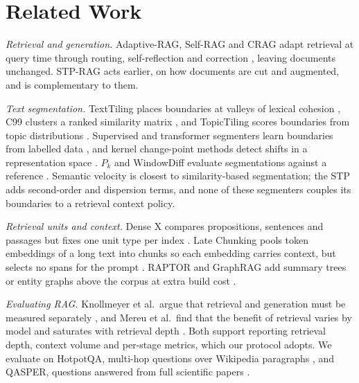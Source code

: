 \documentclass[conference,a4paper]{IEEEtran}
\begin{document}
\section{Related Work}
\label{sec:related}

\textit{Retrieval and generation.} Adaptive-RAG, Self-RAG and CRAG adapt retrieval at query time through routing, self-reflection and correction \cite{jeong2024adaptiverag,asai2024selfrag,yan2024crag}, leaving documents unchanged. STP-RAG acts earlier, on how documents are cut and augmented, and is complementary to them.

\textit{Text segmentation.} TextTiling places boundaries at valleys of lexical cohesion \cite{hearst1997texttiling}, C99 clusters a ranked similarity matrix \cite{choi2000c99}, and TopicTiling scores boundaries from topic distributions \cite{riedl2012topictiling}. Supervised and transformer segmenters learn boundaries from labelled data \cite{koshorek2018textseg,lo2021transformer2}, and kernel change-point methods detect shifts in a representation space \cite{arlot2019kernelchangepoint}. $P_k$ and WindowDiff evaluate segmentations against a reference \cite{beeferman1999statistical,pevzner2002windowdiff}. Semantic velocity is closest to similarity-based segmentation; the STP adds second-order and dispersion terms, and none of these segmenters couples its boundaries to a retrieval context policy.

\textit{Retrieval units and context.} Dense X compares propositions, sentences and passages but fixes one unit type per index \cite{chen2024densex}. Late Chunking pools token embeddings of a long text into chunks so each embedding carries context, but selects no spans for the prompt \cite{gunther2024latechunking}. RAPTOR and GraphRAG add summary trees or entity graphs above the corpus at extra build cost \cite{sarthi2024raptor,edge2024graphrag}.

\textit{Evaluating RAG.} Knollmeyer et al.\ argue that retrieval and generation must be measured separately \cite{knollmeyer2026evaluation}, and Mereu et al.\ find that the benefit of retrieval varies by model and saturates with retrieval depth \cite{mereu2026specializing}. Both support reporting retrieval depth, context volume and per-stage metrics, which our protocol adopts. We evaluate on HotpotQA, multi-hop questions over Wikipedia paragraphs \cite{yang2018hotpotqa}, and QASPER, questions answered from full scientific papers \cite{dasigi2021qasper}.
\end{document}
